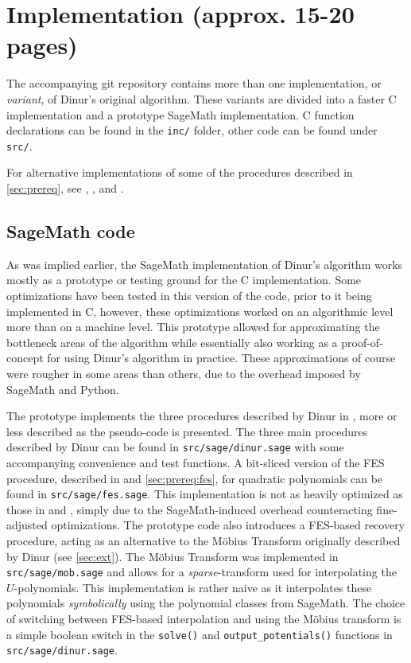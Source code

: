 \section{Implementation (approx. 15-20 pages)} \label{sec:impl}
The accompanying git repository contains more than one implementation, or \textit{variant}, of Dinur's original algorithm. These variants are divided into a faster C implementation and a prototype SageMath implementation. C function declarations can be found in the \texttt{inc/} folder, other code can be found under \texttt{src/}.

For alternative implementations of some of the procedures described in \cref{sec:prereq}, see \cite{ches-2010-23990}, \cite{cryptoeprint:2013/436}, and \cite{crypto-2022-32130}.

\subsection{SageMath code} \label{sec:impl:sage}
As was implied earlier, the SageMath implementation of Dinur's algorithm works mostly as a prototype or testing ground for the C implementation. Some optimizations have been tested in this version of the code, prior to it being implemented in C, however, these optimizations worked on an algorithmic level more than on a machine level.  This prototype allowed for approximating the bottleneck areas of the algorithm while essentially also working as a proof-of-concept for using Dinur's algorithm in practice. These approximations of course were rougher in some areas than others, due to the overhead imposed by SageMath and Python.

The prototype implements the three procedures described by Dinur in \cite{eurocrypt-2021-30841}, more or less described as the pseudo-code is presented. The three main procedures described by Dinur can be found in \texttt{src/sage/dinur.sage} with some accompanying convenience and test functions. A bit-sliced version of the FES procedure, described in \cite{ches-2010-23990} and \cref{sec:prereq:fes}, for quadratic polynomials can be found in \texttt{src/sage/fes.sage}. This implementation is not as heavily optimized as those in \cite{ches-2010-23990} and \cite{cryptoeprint:2013/436}, simply due to the SageMath-induced overhead counteracting fine-adjusted optimizations. The prototype code also introduces a FES-based recovery procedure, acting as an alternative to the Möbius Transform originally described by Dinur (see \cref{sec:ext}). The Möbius Transform was implemented in \texttt{src/sage/mob.sage} and allows for a \textit{sparse}-transform used for interpolating the $U$-polynomials. This implementation is rather naive as it interpolates these polynomials \textit{symbolically} using the polynomial classes from SageMath. The choice of switching between FES-based interpolation and using the Möbius transform is a simple boolean switch in the \texttt{solve()} and \texttt{output\_potentials()} functions in \texttt{src/sage/dinur.sage}.  

